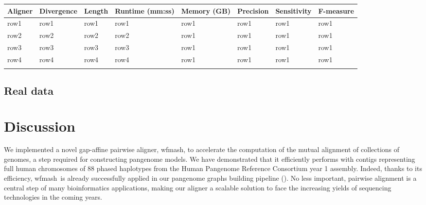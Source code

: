 \documentclass{bioinfo}
\newcommand{\wfmash}{wfmash}
\begin{document}
    \begin{table}[!t]
         {
            \begin{tabular}{@{}llllllll@{}}
                \toprule Aligner & Divergence & Length & Runtime (mm:ss) & Memory (GB) & Precision & Sensitivity & F-measure \\
                \midrule
                row1             & row1       & row1   & row1            & row1        & row1      & row1        & row1      \\
                row2             & row2       & row2   & row2            & row1        & row1      & row1        & row1      \\
                row3             & row3       & row3   & row3            & row1        & row1      & row1        & row1      \\
                row4             & row4       & row4   & row4            & row1        & row1      & row1        & row1      \\
                \botrule
            \end{tabular}
        }

    \end{table}




    \subsection{Real data}


    \section{Discussion}

    We implemented a novel gap-affine pairwise aligner, \wfmash\/, to accelerate the computation of the mutual
    alignment of collections of genomes, a step required for constructing pangenome models. We have demonstrated that
    it efficiently performs with contigs representing full human chromosomes of 88 phased haplotypes from the
    Human Pangenome Reference Consortium year 1 assembly. Indeed, thanks to its efficiency, \wfmash\ is already
    successfully applied in our pangenome graphs building pipeline (\citep{pggb}). No less important, pairwise
    alignment is a central step of many bioinformatics applications, making our aligner a scalable solution to face the
    increasing yields of sequencing technologies in the coming years.
\end{document}
